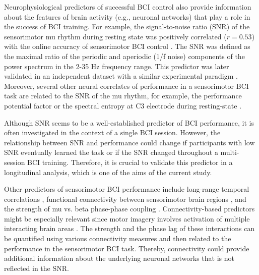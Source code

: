 \medskip

Neurophysiological predictors of successful BCI control also provide information about the features of brain activity (e.g., neuronal networks) that play a role in the success of BCI training. For example, the signal-to-noise ratio (SNR) of the sensorimotor mu rhythm during resting state was positively correlated ($r = 0.53$) with the online accuracy of sensorimotor BCI control \citep{Blankertz2010}. The SNR was defined as the maximal ratio of the periodic and aperiodic (1/f noise) components of the power spectrum in the 2-35 Hz frequency range. This predictor was later validated in an independent dataset with a similar experimental paradigm \citep{Acqualagna2016}. Moreover, several other neural correlates of performance in a sensorimotor BCI task are related to the SNR of the mu rhythm, for example, the performance potential factor \citep{Ahn2013} or the spectral entropy at C3 electrode during resting-state \citep{Zhang2015}. 

\medskip

Although SNR seems to be a well-established predictor of BCI performance, it is often investigated in the context of a single BCI session. However, the relationship between SNR and performance could change if participants with low SNR eventually learned the task or if the SNR changed throughout a multi-session BCI training. Therefore, it is crucial to validate this predictor in a longitudinal analysis, which is one of the aims of the current study.

\medskip

Other predictors of sensorimotor BCI performance include long-range temporal correlations \citep{Samek2016}, functional connectivity between sensorimotor brain regions \citep{Sugata2014, Vidaurre2020}, and the strength of mu vs. beta phase-phase coupling \citep{Jorajuria2023}. Connectivity-based predictors might be especially relevant since motor imagery involves activation of multiple interacting brain areas \citep{Solodkin2004, Halder2011, Hardwick2018}. The strength and the phase lag of these interactions can be quantified using various connectivity measures and then related to the performance in the sensorimotor BCI task. Thereby, connectivity could provide additional information about the underlying neuronal networks that is not reflected in the SNR.

\medskip

